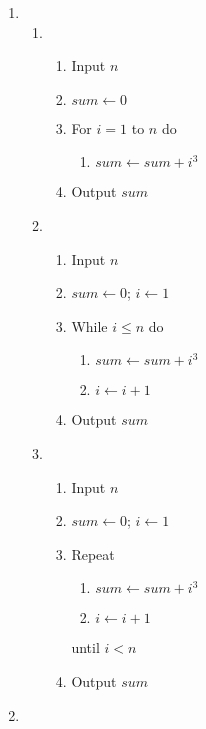 \begin{enumerate}[leftmargin=2cm,labelsep=.5cm,label=\bf\arabic*.]
\item
\begin{enumerate}
  \item
  \begin{enumerate}[label=\arabic*.]
    \item Input $n$
    \item $sum\leftarrow 0$
    \item For $i = 1$ to $n$ do
    \begin{enumerate}[leftmargin=1cm,label*=\arabic*]
      \item $sum\leftarrow sum + i^3$
    \end{enumerate}
    \item Output $sum$\\[5mm]
  \end{enumerate}
  \item
  \begin{enumerate}[label=\arabic*.]
    \item Input $n$
    \item $sum\leftarrow 0$; $i\leftarrow 1$
    \item While $i \leq n$ do
    \begin{enumerate}[leftmargin=1cm,label*=\arabic*]
      \item $sum\leftarrow sum + i^3$
      \item $i\leftarrow i+1$
    \end{enumerate}
    \item Output $sum$\\[5mm]
  \end{enumerate}
  \item
  \begin{enumerate}[label=\arabic*.]
    \item Input $n$
    \item $sum\leftarrow 0$; $i\leftarrow 1$
    \item Repeat
    \begin{enumerate}[leftmargin=1cm,label*=\arabic*]
      \item $sum\leftarrow sum + i^3$
      \item $i\leftarrow i+1$
    \end{enumerate}
    until $i < n$
    \item Output $sum$\\[1cm]
  \end{enumerate}
\end{enumerate}
\item
\begin{enumerate}

\end{enumerate}
\end{enumerate}
